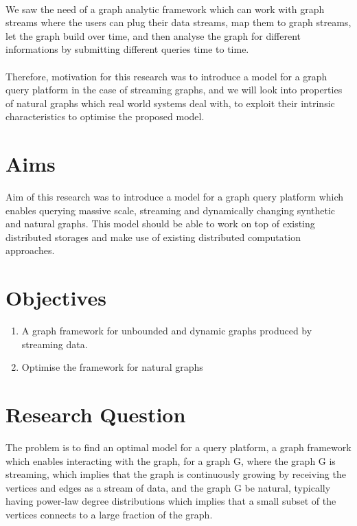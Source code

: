 \documentclass[12pt]{report}
\numberwithin{figure}{section}
\numberwithin{table}{section}
\begin{document}
\paragraph{}

We saw the need of a graph analytic framework which can work with graph streams where the users can plug their data streams, map them to graph streams, let the graph build over time, and then analyse the graph for different informations by submitting different queries time to time.

\paragraph{}

Therefore, motivation for this research was to introduce a model for a graph query platform in the case of streaming graphs, and we will look into properties of natural graphs which real world systems deal with, to exploit their intrinsic characteristics to optimise the proposed model.

\section{Aims} 
Aim of this research was to introduce a model for a graph query platform which enables querying massive scale, streaming and dynamically changing synthetic  and natural graphs. This model should be able to work on top of existing distributed storages and make use of existing distributed computation approaches. 

\section{Objectives}
 

\begin{enumerate}
\item A graph framework for unbounded and dynamic graphs produced by streaming data. 
\item Optimise the framework for natural graphs
\end{enumerate}

\section{Research Question}
The problem is to find an optimal model for a query platform, a graph framework which enables interacting with the graph, for a graph G, where the graph G is streaming, which implies that the graph is continuously growing by receiving the vertices and edges as a stream of data, and the graph G be natural, typically having power-law degree distributions which implies that a small subset of the vertices connects to a large fraction of the graph.
\end{document}

